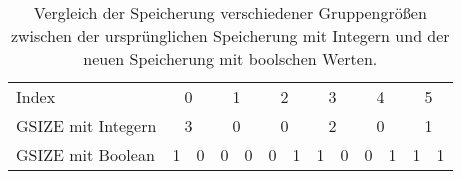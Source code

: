 \begin{table}[H]
\begin{tabular}{l|cc|cc|cc|cc|cc|cc}
Index              & \multicolumn{2}{c|}{0} & \multicolumn{2}{c|}{1} & \multicolumn{2}{c|}{2} & \multicolumn{2}{c|}{3} & \multicolumn{2}{c|}{4} & \multicolumn{2}{c}{5} \\
GSIZE mit Integern & \multicolumn{2}{c|}{3} & \multicolumn{2}{c|}{0} & \multicolumn{2}{c|}{0} & \multicolumn{2}{c|}{2} & \multicolumn{2}{c|}{0} & \multicolumn{2}{c}{1} \\
GSIZE mit Boolean  & 1          & 0         & 0          & 0         & 0          & 1         & 1          & 0         & 0          & 1         & 1         & 1        
\end{tabular}
\caption{Vergleich der Speicherung verschiedener Gruppengrößen zwischen der ursprünglichen Speicherung mit Integern und der neuen Speicherung mit boolschen Werten.}
\label{compare_gsize_variants}
\end{table}